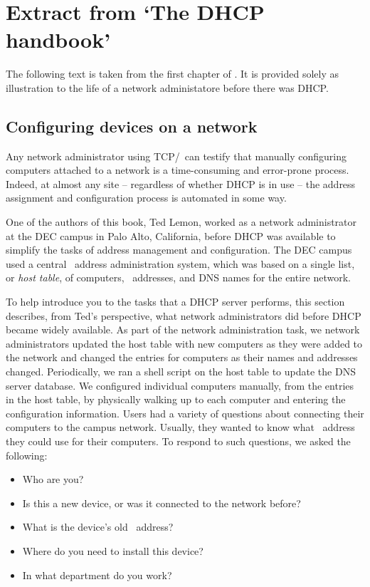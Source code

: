\chapter{Extract from `The \acs{DHCP} handbook'}
\label{chap:dhcp-extract}

The following text is taken from the first chapter of \textcite{droms}.
It is provided solely as illustration to the life of a network administatore before there was \acs{DHCP}.

\section{Configuring devices on a network}
Any network administrator using \acs{TCP}/\IP\ can testify that manually configuring computers attached to a network is a time-consuming and error-prone process.
Indeed, at almost any site -- regardless of whether \acs{DHCP} is in use -- the address assignment and configuration process is automated in some way.

One of the authors of this book, Ted Lemon, worked as a network administrator at the \acf{DEC} campus in Palo Alto, California, before \acs{DHCP} was available to simplify the tasks of address management and configuration.
The \acs{DEC} campus used a central \IP\ address administration system, which was based on a single list, or \emph{host table}, of computers, \IP\ addresses, and \acf{DNS} names for the entire network.

To help introduce you to the tasks that a \acs{DHCP} server performs, this section describes, from Ted's perspective, what network administrators did before \acs{DHCP} became widely available.
As part of the network administration task, we network administrators updated the host table with new computers as they were added to the network and changed the entries for computers as their names and addresses changed.
Periodically, we ran a shell script on the host table to update the \acs{DNS} server database.
We configured individual computers manually, from the entries in the host table, by physically walking up to each computer and entering the configuration information.
Users had a variety of questions about connecting their computers to the campus network.
Usually, they wanted to know what \IP\ address they could use for their computers.
To respond to such questions, we asked the following:
\begin{itemize}
\item
   Who are you?
\item
   Is this a new device, or was it connected to the network before?
\item
   What is the device's old \IP\ address?
\item
   Where do you need to install this device?
\item
   In what department do you work?
\end{itemize}


